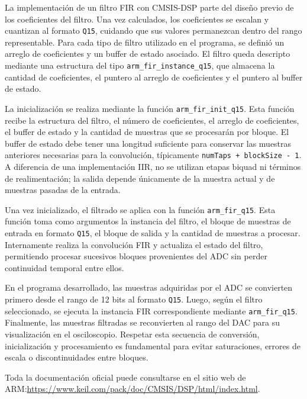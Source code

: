\documentclass[12pt]{article}
\begin{document}
	La implementación de un filtro FIR con CMSIS-DSP parte del diseño previo de los coeficientes del filtro. Una vez calculados, los coeficientes se escalan y cuantizan al formato \texttt{Q15}, cuidando que sus valores permanezcan dentro del rango representable. Para cada tipo de filtro utilizado en el programa, se definió un arreglo de coeficientes y un buffer de estado asociado. El filtro queda descripto mediante una estructura del tipo \texttt{arm\_fir\_instance\_q15}, que almacena la cantidad de coeficientes, el puntero al arreglo de coeficientes y el puntero al buffer de estado.
	
	La inicialización se realiza mediante la función \texttt{arm\_fir\_init\_q15}. Esta función recibe la estructura del filtro, el número de coeficientes, el arreglo de coeficientes, el buffer de estado y la cantidad de muestras que se procesarán por bloque. El buffer de estado debe tener una longitud suficiente para conservar las muestras anteriores necesarias para la convolución, típicamente \texttt{numTaps + blockSize - 1}. A diferencia de una implementación IIR, no se utilizan etapas biquad ni términos de realimentación; la salida depende únicamente de la muestra actual y de muestras pasadas de la entrada.
	
	Una vez inicializado, el filtrado se aplica con la función \texttt{arm\_fir\_q15}. Esta función toma como argumentos la instancia del filtro, el bloque de muestras de entrada en formato \texttt{Q15}, el bloque de salida y la cantidad de muestras a procesar. Internamente realiza la convolución FIR y actualiza el estado del filtro, permitiendo procesar sucesivos bloques provenientes del ADC sin perder continuidad temporal entre ellos.
	
	En el programa desarrollado, las muestras adquiridas por el ADC se convierten primero desde el rango de 12 bits al formato \texttt{Q15}. Luego, según el filtro seleccionado, se ejecuta la instancia FIR correspondiente mediante \texttt{arm\_fir\_q15}. Finalmente, las muestras filtradas se reconvierten al rango del DAC para su visualización en el osciloscopio. Respetar esta secuencia de conversión, inicialización y procesamiento es fundamental para evitar saturaciones, errores de escala o discontinuidades entre bloques.
	
	Toda la documentación oficial puede consultarse en el sitio web de ARM:\newline \href{https://www.keil.com/pack/doc/CMSIS/DSP/html/index.html}{https://www.keil.com/pack/doc/CMSIS/DSP/html/index.html}.
	
\end{document}
